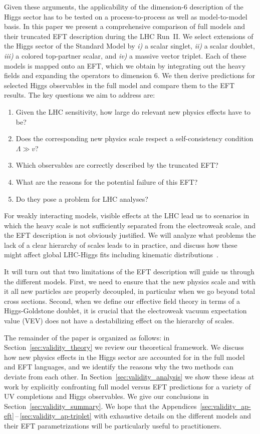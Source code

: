Given these arguments, the applicability of the dimension-6
description of the Higgs sector has to be tested on a
process-to-process as well as model-to-model basis.  In this paper we
present a comprehensive comparison of full models and their truncated
EFT description during the LHC Run~II. We select extensions of the
Higgs sector of the Standard Model by \textit{i)} a scalar singlet,
\textit{ii)} a scalar doublet, \textit{iii)} a colored top-partner
scalar, and \textit{iv)} a massive vector triplet.  Each of these
models is mapped onto an EFT, which we obtain by integrating out the
heavy fields and expanding the operators to dimension 6. We then
derive predictions for selected Higgs observables in the full model
and compare them to the EFT results.  The key questions we aim to
address are:
%
\begin{enumerate}
\item Given the LHC sensitivity, how large do relevant new physics
effects have to be?
\item Does the corresponding new physics scale respect a
self-consistency condition $\Lambda \gg v$?
\item Which observables are correctly described by the truncated EFT?
\item What are the reasons for the potential failure of this EFT?
\item Do they pose a problem for LHC analyses?
\end{enumerate}
%
For weakly interacting models, visible effects at the LHC lead us to
scenarios in which the heavy scale is not sufficiently separated from
the electroweak scale, and the EFT description is not obviously
justified. We will analyze what problems the lack of a clear hierarchy
of scales leads to in practice, and discuss how these might affect
global LHC-Higgs fits including kinematic
distributions~\cite{Corbett:2015ksa}.

It will turn out that two limitations of the EFT description will
guide us through the different models. First, we need to ensure that
the new physics scale and with it all new particles are properly
decoupled, in particular when we go beyond total cross
sections. Second, when we define our effective field theory in terms
of a Higgs-Goldstone doublet, it is crucial that the electroweak
vacuum expectation value (VEV) does not have a destabilizing effect on
the hierarchy of scales.\medskip

The remainder of the paper is organized as follows: in
Section~\ref{sec:validity_theory} we review our theoretical framework. We
discuss how new physics effects in the Higgs sector are accounted for
in the full model and EFT languages, and we identify the reasons why
the two methods can deviate from each other.  In
Section~\ref{sec:validity_analysis} we show these ideas at work by explicitly
confronting full model versus EFT predictions for a variety of UV
completions and Higgs observables.  We give our conclusions in
Section~\ref{sec:validity_summary}. We hope that the
Appendices~\ref{sec:validity_ap-eft}\,--\,\ref{sec:validity_ap-triplet} with exhaustive
details on the different models and their EFT parametrizations will be
particularly useful to practitioners.



